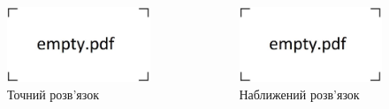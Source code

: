 \documentclass{beamer}
\numberwithin{equation}{section}
\begin{document}
	\begin{frame}
		\begin{columns}[c] 
			\begin{figure}
				\includegraphics[width=1\textwidth]{../images/empty.pdf}
				\caption{Точний розв'язок}	
			\end{figure}
						
			\begin{figure}
				\includegraphics[width=1\textwidth]{../images/empty.pdf}
				\caption{Наближений розв'язок}
			\end{figure}
						
		\end{columns}
		
	\end{frame}	
	

	
\end{document}
